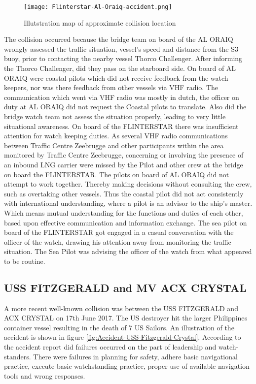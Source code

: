 \begin{figure}[H]
	\centering
	\texttt{[image: Flinterstar-Al-Oraiq-accident.png]}
	\caption{Illutstration map of approximate collision location}
	\label{fig:Accident-Flinterstar-Al-Oraiq}
\end{figure}

The collision occurred because the bridge team on board of the AL ORAIQ wrongly assessed the traffic situation, vessel's speed and distance from the S3 buoy, prior to contacting the nearby vessel Thorco Challenger. After informing the Thorco Challenger, did they pass on the starboard side. On board of AL ORAIQ were coastal pilots which did not receive feedback from the watch keepers, nor was there feedback from other vessels via \ac{VHF} radio. The communication which went via VHF radio was mostly in dutch, the officer on duty at AL ORAIQ did not request the Coastal pilots to translate. Also did the bridge watch team not assess the situation properly, leading to very little situational awareness.
On board of the FLINTERSTAR there was insufficient attention for watch keeping duties. As several VHF radio communications between Traffic Centre Zeebrugge and other participants within the area monitored by Traffic Centre Zeebrugge, concerning or involving the presence of an inbound LNG carrier were missed by the Pilot and other crew at the bridge on board the FLINTERSTAR.
The pilots on board of AL ORAIQ did not attempt to work together. Thereby making decisions without consulting the crew, such as overtaking other vessels. Thus the coastal pilot did not act consistently with international understanding, where a pilot is an advisor to the ship's master. Which means mutual understanding for the functions and duties of each other, based upon effective communication and information exchange. 
The sea pilot on board of the FLINTERSTAR got engaged in a casual conversation with the officer of the watch, drawing his attention away from monitoring the traffic situation. The Sea Pilot was advising the officer of the watch from what appeared to be routine. \cite{Backer2015}

\newpage
\subsection{USS FITZGERALD and MV ACX CRYSTAL}
A more recent well-known collision was between the USS FITZGERALD and ACX CRYSTAL on 17th June 2017. The US destroyer hit the larger Philippines container vessel resulting in the death of 7 US Sailors. An illustration of the accident is shown in figure \ref{fig:Accident-USS-Fitzgerald-Crystal}. According to the accident report did failures occurred on the part of leadership and watch-standers. There were failures in planning for safety, adhere basic navigational practice, execute basic watchstanding practice, proper use of available navigation tools and wrong responses.

